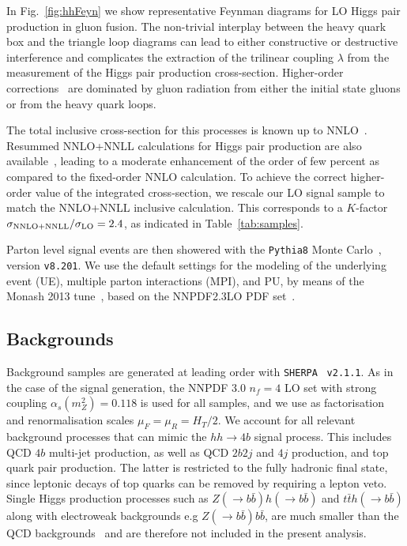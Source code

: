 In Fig.~\ref{fig:hhFeyn} we show representative Feynman diagrams
    for LO Higgs pair production in gluon fusion.
    The non-trivial interplay between the heavy quark box and the triangle loop diagrams
    can lead to either constructive or destructive interference
    and complicates the extraction of
    the trilinear coupling
    $\lambda$ from the measurement of the Higgs pair
    production cross-section.
    Higher-order corrections~\cite{deFlorian:2013jea,Frederix:2014hta}
    are dominated by gluon radiation
    from either the initial state gluons or from the heavy quark loops.

    The total inclusive cross-section for this processes is
    known up to NNLO~\cite{deFlorian:2013jea}.
    Resummed NNLO+NNLL calculations for Higgs pair production are
    also available~\cite{deFlorian:2015moa},
leading to a moderate enhancement of the order of
few percent as compared to the fixed-order NNLO calculation.
%
To achieve the correct higher-order value of the
integrated cross-section, we rescale our LO signal sample to match the
NNLO+NNLL
inclusive calculation.
%
This corresponds to
a $K$-factor $\sigma_{\rm NNLO+NNLL}/\sigma_{\rm LO}=2.4$, as indicated
in Table~\ref{tab:samples}.


Parton level signal events are then showered with the {\tt Pythia8} Monte
Carlo~\cite{Sjostrand:2007gs,Sjostrand:2014zea}, version {\tt v8.201}.
%
We use the default settings for the modeling
of the underlying event (UE), multiple parton
interactions (MPI), and PU, by means
of the Monash 2013 tune~\cite{Skands:2014pea},
based on the NNPDF2.3LO PDF set~\cite{Ball:2012cx,Ball:2013hta}.
%


\subsection{Backgrounds}

Background samples are generated at leading order
with {\tt SHERPA}~\cite{Gleisberg:2008ta} {\tt v2.1.1}.
%
As in the case of the signal generation,
the NNPDF 3.0 $n_f = 4$ LO set with strong coupling
$\alpha_s(m_Z^2)=0.118$ is used for all samples, and
we use as
factorisation and renormalisation scales $\mu_F=\mu_R=H_T/2$.
%
We account for all relevant background
processes that can mimic the
 $hh\to 4b$ signal process.
%
This includes  QCD $4b$ multi-jet production, as well as
QCD $2b2j$ and $4j$ production, and top quark pair
production.
%
The latter is restricted to the fully hadronic final state,
since 
leptonic decays of top quarks can be removed by requiring
a lepton veto.
%
Single Higgs production processes such as $Z(\to b\bar{b})h(\to b\bar{b})$
and $t\bar{t}h(\to b\bar{b})$ along with electroweak backgrounds e.g $Z(\to b\bar{b})b\bar{b}$,
are much smaller than the QCD backgrounds~\cite{Wardrope:2014kya,deLima:2014dta}
and are therefore not included in the present analysis.
%



